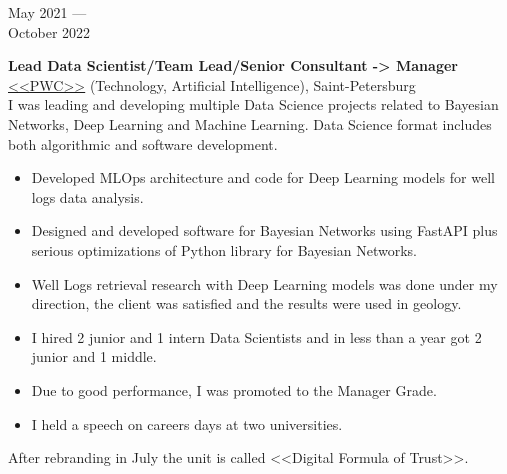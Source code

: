 \documentclass[10pt,a4paper]{article}
\newcommand{\lmpratio}{0.15}
\newcommand{\rmpratio}{0.74}
\newcommand{\vSpace}{0.5cm}
\newcommand{\horizontalSpace}{0.05\textwidth}
\newcommand{\sectionMain}[1]{\textbf{#1}}
\begin{document}
 
	\begin{minipage}[t]{\lmpratio\textwidth}
		May 2021 --- \\October 2022
	\end{minipage}
	\hspace{\horizontalSpace}
	\begin{minipage}[t]{\rmpratio\textwidth}
		\sectionMain{Lead Data Scientist/Team Lead/Senior Consultant -> Manager}\\
		\href{https://www.pwc.ru/}{<<PWC>>} (Technology, Artificial Intelligence), Saint-Petersburg\\[0.1cm]		

I was leading and developing multiple Data Science projects related to Bayesian Networks, Deep Learning and Machine Learning.
Data Science format includes both algorithmic and software development.

		\begin{itemize}
                \item 
Developed MLOps architecture and code for Deep Learning models for well logs data analysis.
			\item 
Designed and developed software for Bayesian Networks using FastAPI plus serious optimizations of Python library for Bayesian Networks.
			\item 
Well Logs retrieval research with Deep Learning models was done under my direction, the client was satisfied and the results were used in geology.
                \item 
I hired 2 junior and 1 intern Data Scientists and in less than a year got 2 junior and 1 middle.
                \item 
Due to good performance, I was promoted to the Manager Grade.
                \item 
I held a speech on careers days at two universities.
		\end{itemize}
		
After rebranding in July the unit is called <<Digital Formula of Trust>>.
		
	\end{minipage}	
	\vspace{\vSpace}
	
\end{document}
